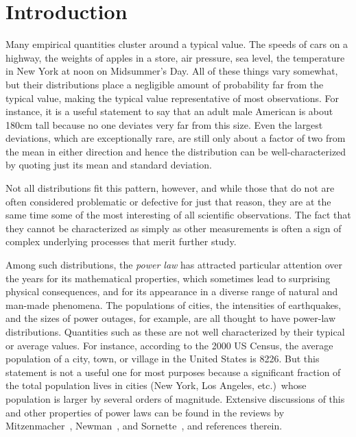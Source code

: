 \documentclass[final]{siamltex}
\newcommand{\defn}{\textit}
\begin{document}
\section{Introduction}

Many empirical quantities cluster around a typical value.  The speeds of
cars on a highway, the weights of apples in a store, air pressure, sea
level, the temperature in New York at noon on Midsummer's Day.  All of
these things vary somewhat, but their distributions place a negligible
amount of probability far from the typical value, making the typical value
representative of most observations.  For instance, it is a useful
statement to say that an adult male American is about 180cm tall because no
one deviates very far from this size.  Even the largest deviations, which
are exceptionally rare, are still only about a factor of two from the mean
in either direction and hence the distribution can be well-characterized by
quoting just its mean and standard deviation.

Not all distributions fit this pattern, however, and while those that do
not are often considered problematic or defective for just that reason,
they are at the same time some of the most interesting of all scientific
observations.  The fact that they cannot be characterized as simply as
other measurements is often a sign of complex underlying processes that
merit further study.

Among such distributions, the \defn{power law} has attracted particular
attention over the years for its mathematical properties, which sometimes
lead to surprising physical consequences, and for its appearance in a
diverse range of natural and man-made phenomena.  The populations of
cities, the intensities of earthquakes, and the sizes of power outages, for
example, are all thought to have power-law distributions.  Quantities such
as these are not well characterized by their typical or average values.
For instance, according to the 2000 US Census, the average population of a
city, town, or village in the United States is 8226.  But this statement is
not a useful one for most purposes because a significant fraction of the
total population lives in cities (New York, Los Angeles, etc.)\ whose
population is larger by several orders of magnitude.  Extensive discussions
of this and other properties of power laws can be found in the reviews by
Mitzenmacher~\cite{Mitzenmacher04}, Newman~\cite{MEJN-on-power-laws}, and
Sornette~\cite{Sornette06pl}, and references therein.
\end{document}
